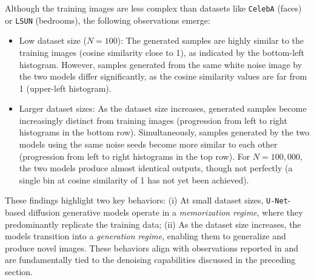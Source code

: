 \documentclass[fleqn,usenatbib]{mnras}
\begin{document}
Although the training images are less complex than datasets like \texttt{CelebA} (faces) or \texttt{LSUN} (bedrooms), the following observations emerge:
\begin{itemize}
    \item {Low dataset size ($N=100$):} 
    The generated samples are highly similar to the training images (cosine similarity close to 1), as indicated by the bottom-left histogram. However, samples generated from the same white noise image by the two models differ significantly, as the cosine similarity values are far from 1 (upper-left histogram).
    \item {Larger dataset sizes:} 
    As the dataset size increases, generated samples become increasingly distinct from training images (progression from left to right histograms in the bottom row). Simultaneously, samples generated by the two models using the same noise seeds become more similar to each other (progression from left to right histograms in the top row). For $N=100,000$, the two models produce almost identical outputs, though not perfectly (a single bin at cosine similarity of 1 has not yet been achieved).
\end{itemize}
%
These findings highlight two key behaviors: (i) At small dataset sizes, \texttt{U-Net}-based diffusion generative models operate in a \textit{memorization regime}, where they predominantly replicate the training data; (ii) As the dataset size increases, the models transition into a \textit{generation regime}, enabling them to generalize and produce novel images. These behaviors align with observations reported in \cite{kadkhodaie2024generalization} and are fundamentally tied to the denoising capabilities discussed in the preceding section.
\end{document}
